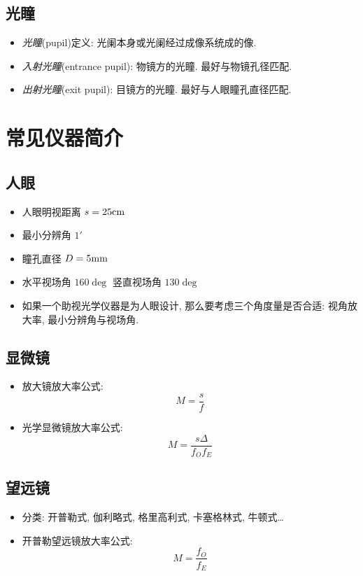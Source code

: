 \subsection{光瞳}

\begin{itemize}
\item \emph{光瞳}(pupil)定义: 光阑本身或光阑经过成像系统成的像.
\item \emph{入射光瞳}(entrance pupil): 物镜方的光瞳. 最好与物镜孔径匹配.
\item \emph{出射光瞳}(exit pupil): 目镜方的光瞳. 最好与人眼瞳孔直径匹配.
\end{itemize}

\section{常见仪器简介}

\subsection{人眼}

\begin{itemize}
\item 人眼明视距离 $s = 25{\rm cm}$
\item 最小分辨角 $1'$
\item 瞳孔直径 $D = 5{\rm mm}$
\item 水平视场角 $160\deg$ 竖直视场角 $130\deg$
\item 如果一个助视光学仪器是为人眼设计, 那么要考虑三个角度量是否合适: 视角放大率, 最小分辨角与视场角.
\end{itemize}

\subsection{显微镜}

\begin{itemize}
\item 放大镜放大率公式:
\[M=\frac{s}{f}\]
\item 光学显微镜放大率公式:
\[M=\frac{s\Delta}{f_Of_E}\]
\end{itemize}

\subsection{望远镜}

\begin{itemize}
\item 分类: 开普勒式, 伽利略式, 格里高利式, 卡塞格林式, 牛顿式\ldots
\item 开普勒望远镜放大率公式:
\[M=\frac{f_O}{f_E}\]
\end{itemize}

